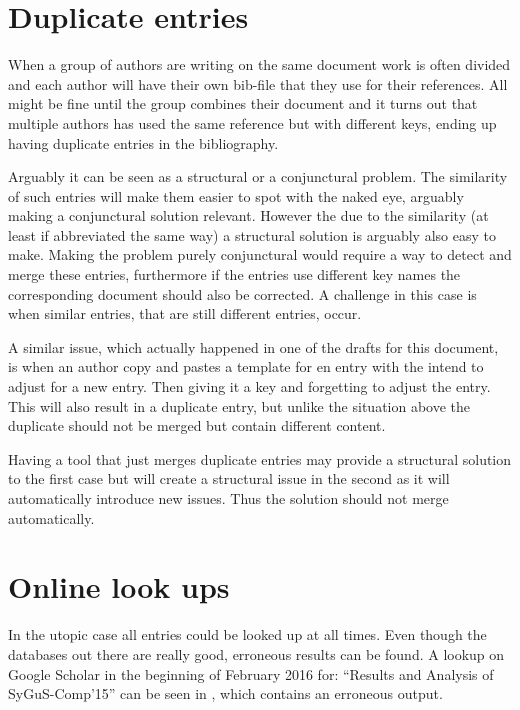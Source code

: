 \section{Duplicate entries}
\label{sec:problems_duplicates}

When a group of authors are writing on the same document work is often
divided and each author will have their own bib-file that they use for
their references.  All might be fine until the group combines their
document and it turns out that multiple authors has used the same
reference but with different keys, ending up having duplicate entries
in the bibliography.

Arguably it can be seen as a structural or a conjunctural problem.
The similarity of such entries will make them easier to spot with the
naked eye, arguably making a conjunctural solution relevant.  However
the due to the similarity (at least if abbreviated the same way) a
structural solution is arguably also easy to make.  Making the problem
purely conjunctural would require a way to detect and merge these
entries, furthermore if the entries use different key names the
corresponding document should also be corrected. A challenge in this
case is when similar entries, that are still different entries, occur.

A similar issue, which actually happened in one of the drafts for this
document, is when an author copy and pastes a template for en entry
with the intend to adjust for a new entry.  Then giving it a key and
forgetting to adjust the entry.  This will also result in a duplicate
entry, but unlike the situation above the duplicate should not be
merged but contain different content.

Having a tool that just merges duplicate entries may provide a
structural solution to the first case but will create a structural
issue in the second as it will automatically introduce new issues.
Thus the solution should not merge automatically.


\section{Online look ups}
\label{sec:problems_look_ups}

In the utopic case all entries could be looked up at all times.  Even
though the databases out there are really good, erroneous results can
be found.  A lookup on Google Scholar in the beginning of February
2016 for: ``Results and Analysis of SyGuS-Comp’15'' can be seen in
, which contains an erroneous output.

